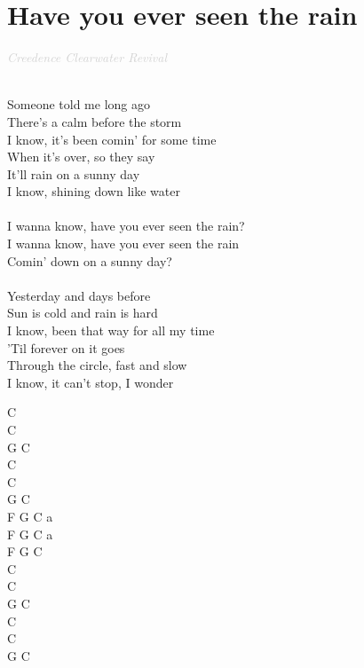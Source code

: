 \documentclass[a5paper, 10pt]{book}
\begin{document}
\section{Have you ever seen the rain}\textcolor{lightgray}{\textit{Creedence Clearwater Revival}}\\~\\
\begin{minipage}[t]{0.7\textwidth}
  Someone told me long ago\\
  There's a calm before the storm\\
  I know, it's been comin' for some time\\
  When it's over, so they say\\
  It'll rain on a sunny day\\
  I know, shining down like water\\
  \\
  I wanna know, have you ever seen the rain?\\
  I wanna know, have you ever seen the rain\\
  Comin' down on a sunny day?\\
  \\
  Yesterday and days before\\
  Sun is cold and rain is hard\\
  I know, been that way for all my time\\
  'Til forever on it goes\\
  Through the circle, fast and slow\\
  I know, it can't stop, I wonder\\
\end{minipage}
\begin{minipage}[t]{0.3\textwidth}
  C\\ C\\
  G C\\
  C\\ C\\
  G C\\

  F G C a\\
  F G C a\\
  F G C\\

  C\\ C\\
  G C\\
  C\\ C\\
  G C\\
\end{minipage}
\end{document}
